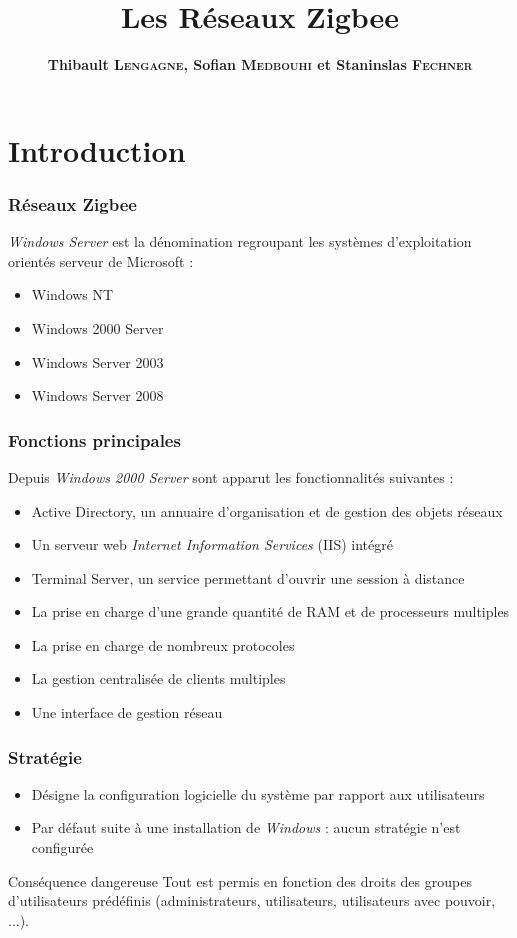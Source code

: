 \documentclass{beamer}
\title{Les Réseaux Zigbee}
\author{\textbf{Thibault \textsc{Lengagne}, Sofian \textsc{Medbouhi} et Staninslas \textsc{Fechner}}}
\institute{Centrale Supélec - Campus de Rennes}
\begin{document}
  \begin{frame}
    \titlepage
  \end{frame}
  

  \section{Introduction}
  \begin{frame}
   \frametitle{Réseaux Zigbee}
   \textit{Windows Server} est la dénomination regroupant les systèmes d'exploitation orientés serveur de Microsoft :
   \begin{itemize}
    \item Windows NT
    \item Windows 2000 Server
    \item Windows Server 2003
    \item Windows Server 2008

   \end{itemize}
  \end{frame}
  
  \begin{frame}
   \frametitle{Fonctions principales}
   Depuis \textit{Windows 2000 Server} sont apparut les fonctionnalités suivantes :
   \begin{itemize}
    \item Active Directory, un annuaire d'organisation et de gestion des objets réseaux
    \item Un serveur web \textit{Internet Information Services} (IIS) intégré
    \item Terminal Server, un service permettant d'ouvrir une session à distance
    \item La prise en charge d'une grande quantité de RAM et de processeurs multiples
    \item La prise en charge de nombreux protocoles
    \item La gestion centralisée de clients multiples
    \item Une interface de gestion réseau
   \end{itemize}
  \end{frame}

  \begin{frame}
     \frametitle{Stratégie}
    \begin{itemize}
     \item Désigne la configuration logicielle du système par rapport aux utilisateurs
     \item Par défaut suite à une installation de \textit{Windows} : aucun stratégie n'est configurée
    \end{itemize}
    \begin{alertblock}{Conséquence dangereuse}
     Tout est permis en fonction des droits des groupes d'utilisateurs prédéfinis (administrateurs, utilisateurs, utilisateurs avec pouvoir, ...).
    \end{alertblock}
  \end{frame}
  
\end{document}
